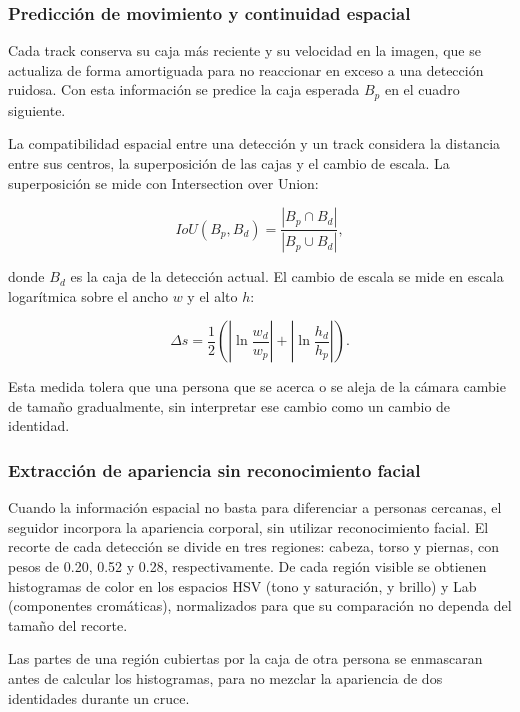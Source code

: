\documentclass[12pt,a4paper]{article}
\begin{document}
\subsubsection{Predicción de movimiento y continuidad espacial}

Cada track conserva su caja más reciente y su velocidad en la imagen,
que se actualiza de forma amortiguada para no reaccionar en exceso a una
detección ruidosa. Con esta información se predice la caja esperada
$B_p$ en el cuadro siguiente.

La compatibilidad espacial entre una detección y un track considera la
distancia entre sus centros, la superposición de las cajas y el cambio
de escala. La superposición se mide con Intersection over Union:

\begin{equation}
IoU(B_p,B_d)=
\frac{|B_p \cap B_d|}
{|B_p \cup B_d|},
\end{equation}

donde $B_d$ es la caja de la detección actual. El cambio de escala se
mide en escala logarítmica sobre el ancho $w$ y el alto $h$:

\begin{equation}
\Delta s=
\frac{1}{2}
\left(
\left|\ln\frac{w_d}{w_p}\right|
+
\left|\ln\frac{h_d}{h_p}\right|
\right).
\end{equation}

Esta medida tolera que una persona que se acerca o se aleja de la cámara
cambie de tamaño gradualmente, sin interpretar ese cambio como un cambio
de identidad.

\subsubsection{Extracción de apariencia sin reconocimiento facial}

Cuando la información espacial no basta para diferenciar a personas
cercanas, el seguidor incorpora la apariencia corporal, sin utilizar
reconocimiento facial. El recorte de cada detección se divide en tres
regiones: cabeza, torso y piernas, con pesos de 0.20, 0.52 y 0.28,
respectivamente. De cada región visible se obtienen histogramas de color
en los espacios HSV (tono y saturación, y brillo) y Lab (componentes
cromáticas), normalizados para que su comparación no dependa del tamaño
del recorte.

Las partes de una región cubiertas por la caja de otra persona se
enmascaran antes de calcular los histogramas, para no mezclar la
apariencia de dos identidades durante un cruce.
\end{document}
